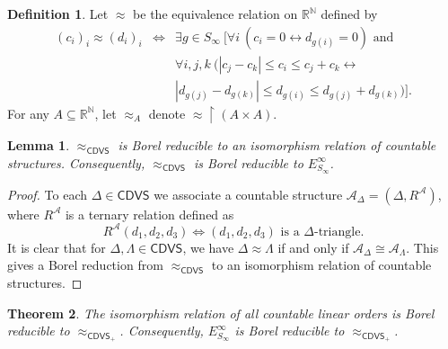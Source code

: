 \documentclass[10pt,a4paper]{amsart}
\newtheorem{theorem}{Theorem}[section]
\newtheorem{lemma}[theorem]{Lemma}
\theoremstyle{definition}
\newtheorem{definition}{Definition}[section]
\theoremstyle{remark}
\begin{document}
\begin{definition}\label{def:er} %
Let $\approx$ be the equivalence relation on $\mathbb{R}^{\mathbb{N}}$ defined by
$$\begin{array}{rcl} (c_i)_i\approx (d_i)_i&\iff& \exists g\in S_\infty\ [\forall i\ (c_i=0\longleftrightarrow d_{g(i)}=0) \mbox{ and } \\
& & \forall i, j, k\ (|c_j-c_k|\leq c_i\leq c_j+c_k\longleftrightarrow \\
& & |d_{g(j)}-d_{g(k)}|\leq d_{g(i)}\leq d_{g(j)}+d_{g(k)})].
\end{array}
$$
For any $A\subseteq \mathbb{R}^{\mathbb{N}}$, %
let $\approx_A$ denote $\approx\upharpoonright (A\times A)$.
\end{definition}

\begin{lemma}\label{lem:isomorphism} $\approx_{\mathsf{CDVS}}$ is Borel reducible to an isomorphism relation of countable structures. Consequently, $\approx_{\mathsf{CDVS}}$ is Borel reducible to $E^\infty_{S_\infty}$.
\end{lemma}

\begin{proof} To each $\Delta\in \mathsf{CDVS}$ we associate a countable structure $\mathcal{A}_\Delta=(\Delta, R^{\mathcal{A}})$, where $R^{\mathcal{A}}$ is a ternary relation defined as
$$ R^{\mathcal{A}}(d_1,d_2,d_3)\iff \mbox{$(d_1,d_2,d_3)$ is a $\Delta$-triangle.}$$
It is clear that for $\Delta, \Lambda\in \mathsf{CDVS}$, we have $\Delta\approx \Lambda$ if and only if $\mathcal{A}_\Delta\cong \mathcal{A}_{\Lambda}$. This gives a Borel reduction from $\approx_{\mathsf{CDVS}}$ to an isomorphism relation of countable structures.
\end{proof}

\begin{theorem}\label{thm:CDVS+} The isomorphism relation of all countable linear orders is Borel reducible to $\approx_{\mathsf{CDVS}_+}$. Consequently, $E^\infty_{S_\infty}$ is Borel reducible to $\approx_{\mathsf{CDVS}_+}$.
\end{theorem}
\end{document}
